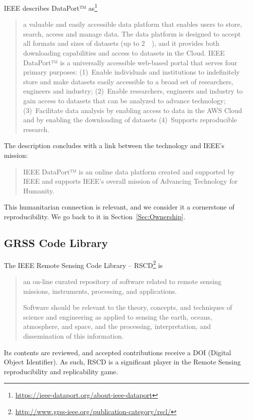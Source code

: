 \documentclass[journal,twoside]{IEEEtran}
\begin{document}
IEEE describes DataPort™ as\footnote{\url{https://ieee-dataport.org/about-ieee-dataport}} 
\begin{quote}
	a valuable and easily accessible data platform that enables users to store, search, access and manage data.  
	The data platform is designed to accept all formats and sizes of datasets (up to \SI{2}{\tera\byte}), and it provides both downloading capabilities and access to datasets in the Cloud.  
	IEEE DataPort™ is a universally accessible web-based portal that serves four primary purposes: 
	(1)~Enable individuals and institutions to indefinitely store and make datasets easily accessible to a broad set of researchers, engineers and industry;  
	(2)~Enable researchers, engineers and industry to gain access to datasets that can be analyzed to advance technology;
	(3)~Facilitate data analysis by enabling access to data in the AWS Cloud and by enabling the downloading of datasets
	(4)~Supports reproducible research.
\end{quote}

The description concludes with a link between the technology and IEEE's mission:
\begin{quote}
	IEEE DataPort™ is an online data platform created and supported by IEEE and supports IEEE’s overall mission of Advancing Technology for Humanity.  
\end{quote}
This humanitarian connection is relevant, and we consider it a cornerstone of reproducibility.
We go back to it in Section~\ref{Sec:Ownership}.


\subsection{GRSS Code Library}

The IEEE Remote Sensing Code Library -- RSCD\footnote{\url{http://www.grss-ieee.org/publication-category/rscl/}} is 
\begin{quote}
	an on-line curated repository of software related to remote sensing missions, instruments, processing, and applications.
	
	Software should be relevant to the theory, concepts, and techniques of science and engineering as applied to sensing the earth, oceans, atmosphere, and space, and the processing, interpretation, and dissemination of this information.
\end{quote}

Its contents are reviewed, and accepted contributions receive a DOI (Digital Object Identifier).
As such, RSCD is a significant player in the Remote Sensing reproducibility and replicability game.
\end{document}
